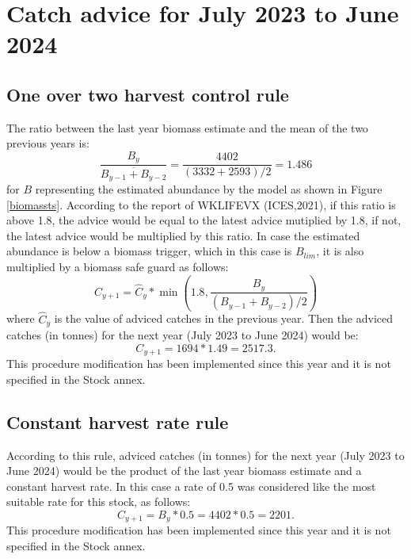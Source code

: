 \documentclass[review]{elsarticle}
\begin{document}
\section{Catch advice for July 2023 to June 2024}
\subsection{One over two harvest control rule}
The ratio between the last year biomass estimate and the mean of the two previous years is: $$\frac{B_{y}}{\overline{B_{y-1}+B_{y-2}}}=\frac{4402}{(3332+2593)/2}=1.486$$ for  $B$ representing the estimated abundance by the model as shown in Figure \ref{biomassts}. According to the report of WKLIFEVX (ICES,2021), if this ratio is above 1.8, the advice would be equal to the latest advice mutiplied by 1.8, if not,  the latest advice would be multiplied by this ratio. In case the estimated abundance is below a biomass trigger, which in this case is $B_{lim}$, it is also multiplied by a biomass safe guard as follows:  $$C_{y+1}=\hat{C}_{y}*\min\left(1.8,\frac{B_{y}}{(B_{y-1}+B_{y-2})/2}\right)$$ where  $\hat{C}_{y}$ is the value of adviced catches in the previous year. Then the adviced catches (in tonnes) for the next year (July 2023 to June 2024) would be: $$C_{y+1}=1694*1.49=2517.3.$$  This procedure modification has been implemented since this year and it is not specified in the Stock annex.
\subsection{Constant harvest rate rule}
According to this rule, adviced catches (in tonnes) for the next year (July 2023 to June 2024) would be the product of the last year biomass estimate and a constant harvest rate. In this case a rate of 0.5 was considered like the most suitable rate for this stock, as follows:
$$C_{y+1}=B_{y}*0.5=4402*0.5=2201.$$
This procedure modification has been implemented since this year and it is not specified in the Stock annex.

\end{document}
